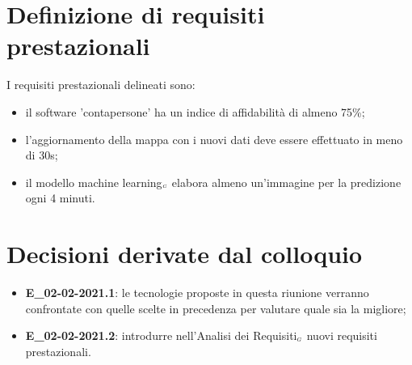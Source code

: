 \section{Definizione di requisiti prestazionali}
I requisiti prestazionali delineati sono:
\begin{itemize}
	\item il software 'contapersone' ha un indice di affidabilità di almeno 75\%;
	\item l'aggiornamento della mappa con i nuovi dati deve essere effettuato in meno di 30s;
	\item il modello machine learning$_{\scaleto{G}{3pt}}$ elabora almeno un'immagine per la predizione ogni 4 minuti.
\end{itemize}
\section{Decisioni derivate dal colloquio}
\begin{itemize}
	\item \textbf{E\_02-02-2021.1}: le tecnologie proposte in questa riunione verranno confrontate con quelle scelte in precedenza per valutare quale sia la migliore;
	\item \textbf{E\_02-02-2021.2}: introdurre nell'Analisi dei Requisiti$_{\scaleto{G}{3pt}}$ nuovi requisiti prestazionali.
\end{itemize}
